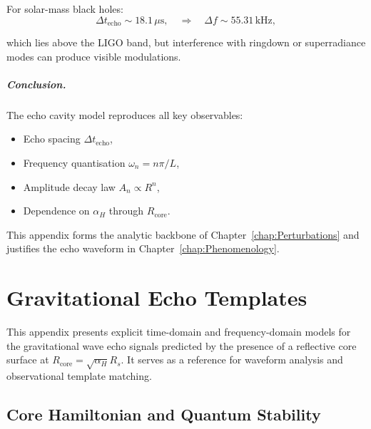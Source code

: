 \documentclass[a4paper, 12pt, oneside]{book}
\numberwithin{equation}{chapter}
\begin{document}
For solar-mass black holes:
\[
    \Delta t_{\text{echo}} \sim 18.1\,\mu\text{s},
    \quad \Rightarrow\quad
    \Delta f \sim 55.31\,\text{kHz},
\]

which lies above the LIGO band, but interference with ringdown or superradiance modes can produce visible modulations.

\paragraph{Conclusion.}
The echo cavity model reproduces all key observables:
\begin{itemize}
  \item Echo spacing \(\Delta t_{\text{echo}}\),
  \item Frequency quantisation \(\omega_n = n\pi / L\),
  \item Amplitude decay law \( A_n \propto R^n \),
  \item Dependence on \( \alpha_H \) through \( R_{\text{core}} \).
\end{itemize}

This appendix forms the analytic backbone of Chapter~\ref{chap:Perturbations} and justifies the echo waveform in Chapter~\ref{chap:Phenomenology}.



\chapter{Gravitational Echo Templates}
\label{app:EchoTemplates}

\noindent
This appendix presents explicit time-domain and frequency-domain models for the gravitational wave echo signals  
predicted by the presence of a reflective core surface at \( R_{\text{core}} = \sqrt{\alpha_H} R_s \).  
It serves as a reference for waveform analysis and observational template matching.

\section[Core Hamiltonian]{Core Hamiltonian and Quantum Stability}
\label{sec:CoreHamiltonian}
\end{document}
